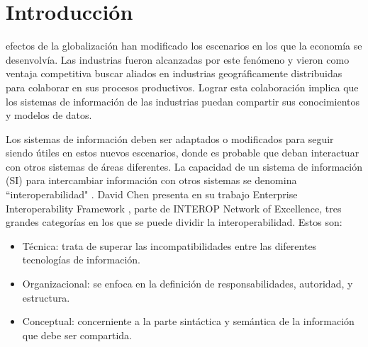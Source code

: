 \documentclass[journal]{IEEEtran}
\begin{document}
\section{Introducci\'on}
% 
% 
% 
% 
 efectos de la globalizaci\'on han modificado los escenarios en los que la econom\'ia se desenvolv\'ia. Las industrias fueron alcanzadas por este fen\'omeno y vieron como ventaja competitiva buscar aliados en industrias geogr\'aficamente distribuidas para colaborar en sus procesos productivos. Lograr esta colaboraci\'on implica que los sistemas de informaci\'on de las industrias puedan compartir sus conocimientos y modelos de datos. 

Los sistemas de informaci\'on deben ser adaptados o modificados para seguir siendo \'utiles en estos nuevos escenarios, donde es probable que deban interactuar con otros sistemas de \'areas diferentes. La capacidad de un sistema de informaci\'on (SI) para intercambiar informaci\'on con otros sistemas se denomina ``interoperabilidad" \cite{Ray2006}. David Chen presenta en su trabajo Enterprise Interoperability Framework \cite{Sinderen2011}, parte de INTEROP Network of Excellence, tres grandes categor\'ias en los que se puede dividir la interoperabilidad. Estos son:

\begin{itemize}
\item T\'ecnica: trata de superar las incompatibilidades entre las diferentes tecnolog\'ias de informaci\'on.  
\item Organizacional: se enfoca en la definici\'on de responsabilidades, autoridad, y estructura. 
\item Conceptual: concerniente a la parte sint\'actica y sem\'antica de la informaci\'on que debe ser compartida.
\end{itemize}
\end{document}
